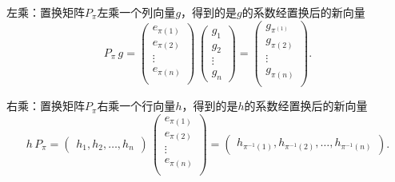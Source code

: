 左乘：置换矩阵$P_{\pi}$左乘一个列向量$g$，得到的是$g$的系数经置换后的新向量
\begin{equation*}
  P_{\pi} \, g=
  \begin{pmatrix}
    e_{\pi(1)} \\
    e_{\pi(2)} \\
    \vdots \\
    e_{\pi(n)} \\
  \end{pmatrix}
  \,
  \begin{pmatrix}
    g_{1} \\ g_{2} \\ \vdots \\ g_{n}
  \end{pmatrix}
  =
  \begin{pmatrix}
    g_{\pi^(1)} \\
    g_{\pi(2)} \\
    \vdots \\
    g_{\pi(n)} \\
  \end{pmatrix}.
\end{equation*}

右乘：置换矩阵$P_{\pi}$右乘一个行向量$h$，得到的是$h$的系数经置换后的新向量
\begin{equation*}
  h \,   P_{\pi} =
  \begin{pmatrix}
    h_{1} , h_{2} , \ldots , h_{n}
  \end{pmatrix}
  \,
  \begin{pmatrix}
    e_{\pi(1)} \\
    e_{\pi(2)} \\
    \vdots \\
    e_{\pi(n)} \\
  \end{pmatrix}
  =
  \begin{pmatrix}
    h_{\pi^{-1}(1)} ,
    h_{\pi^{-1}(2)} ,
    \ldots,
    h_{\pi^{-1}(n)}
  \end{pmatrix}.
\end{equation*}

